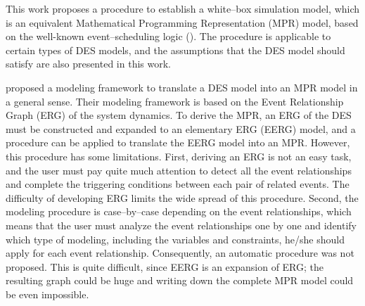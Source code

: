 \documentclass[suppldata]{interact}
\theoremstyle{plain}
\theoremstyle{definition}
\theoremstyle{remark}
\begin{document}
This work proposes a procedure to establish a white--box simulation model, which is an equivalent Mathematical Programming Representation (MPR) model, based on the well-known event--scheduling logic (\cite{law2014simulation}). %
The procedure is applicable to certain types of DES models, and the assumptions that the DES model should satisfy are also presented in this work.


\cite{chan2008optimization} proposed a modeling framework to translate a DES model into an MPR model in a general sense. Their modeling framework is based on the Event Relationship Graph (ERG) of the system dynamics. To derive the MPR, %
an ERG of the DES must be constructed and expanded to an elementary ERG (EERG) model, and a procedure can be applied to translate the EERG model into an MPR. %
However, this procedure has some limitations. First, deriving an ERG is not an easy task, and the user must pay quite much attention to detect all the event relationships and complete the triggering conditions between each pair of related events. %
The difficulty of developing ERG limits the wide spread of this procedure. 
Second, the modeling procedure is case--by--case depending on the event relationships, which means that the user must analyze the event relationships one by one and identify which type of modeling, including the variables and constraints, he/she should apply for each event relationship. Consequently, an automatic procedure was not proposed. 
This is quite %
difficult, since EERG is an expansion of ERG; the resulting graph could be huge and writing down the complete MPR model could be even impossible.  
\end{document}
